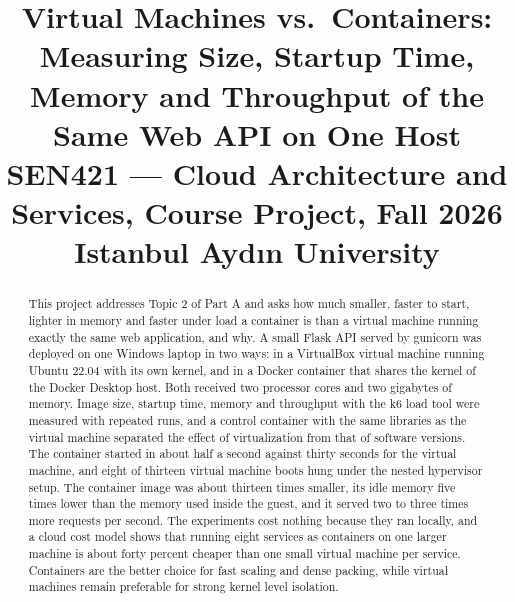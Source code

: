 \documentclass[conference,a4paper]{IEEEtran}
\begin{document}
\title{Virtual Machines vs.\ Containers: Measuring Size, Startup Time, Memory and Throughput of the Same Web API on One Host\\
	{\footnotesize SEN421 --- Cloud Architecture and Services, Course Project, Fall 2026\\
		Istanbul Ayd\i n University}
}

\author{
}

\maketitle

\begin{abstract}
This project addresses Topic 2 of Part A and asks how much smaller, faster to start, lighter in memory and faster under load a container is than a virtual machine running exactly the same web application, and why. A small Flask API served by gunicorn was deployed on one Windows laptop in two ways: in a VirtualBox virtual machine running Ubuntu 22.04 with its own kernel, and in a Docker container that shares the kernel of the Docker Desktop host. Both received two processor cores and two gigabytes of memory. Image size, startup time, memory and throughput with the k6 load tool were measured with repeated runs, and a control container with the same libraries as the virtual machine separated the effect of virtualization from that of software versions. The container started in about half a second against thirty seconds for the virtual machine, and eight of thirteen virtual machine boots hung under the nested hypervisor setup. The container image was about thirteen times smaller, its idle memory five times lower than the memory used inside the guest, and it served two to three times more requests per second. The experiments cost nothing because they ran locally, and a cloud cost model shows that running eight services as containers on one larger machine is about forty percent cheaper than one small virtual machine per service. Containers are the better choice for fast scaling and dense packing, while virtual machines remain preferable for strong kernel level isolation.
\end{abstract}
\end{document}
